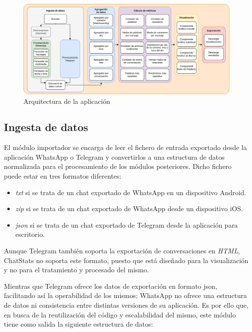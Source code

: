 \begin{figure}[H]
	\centering
	\includegraphics[width=\textwidth]{img/architecture_processing.png}
	\caption{Arquitectura de la aplicación}
	\label{fig:chap4:architecture_processing}
\end{figure}

\subsection{Ingesta de datos}
\label{chap:architecture_ingesta}

El módulo importador se encarga de leer el fichero de entrada exportado desde la aplicación WhatsApp o Telegram y convertirlos a una estructura de datos normalizada para el procesamiento de los módulos posteriores. Dicho fichero puede estar en tres formatos diferentes:

\begin{itemize}
	\item \textit{txt} si se trata de un chat exportado de WhatsApp en un dispositivo Android.
	\item \textit{zip} si se trata de un chat exportado de WhatsApp desde un dispositivo iOS.
	\item \textit{\acrshort{json}} si se trata de un chat exportado de Telegram desde la aplicación para escritorio.
\end{itemize}

Aunque Telegram también soporta la exportación de conversaciones en \textit{HTML}, ChatStats no soporta este formato, puesto que está diseñado para la visualización y no para el tratamiento y procesado del mismo.


Mientras que Telegram ofrece los datos de exportación en formato \acrshort{json}, facilitando así la operabilidad de los mismos; WhatsApp no ofrece una estructura de datos ni consistencia entre distintas versiones de su aplicación. Es por ello que, en busca de la reutilización del código y escalabilidad del mismo, este módulo tiene como salida la siguiente estructura de datos:

